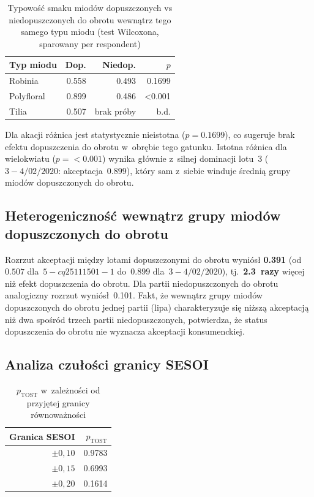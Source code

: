 \begin{table}[h]
\centering
\caption{Typowość smaku miodów dopuszczonych vs niedopuszczonych do obrotu
         wewnątrz tego samego typu miodu
         (test Wilcoxona, sparowany per respondent)}
\label{tab:within}
\begin{tabular}{lrrr}
\toprule
Typ miodu  & Dop.        & Niedop.          & $p$ \\
\midrule
Robinia    & 0.558  & 0.493  & 0.1699 \\
Polyfloral & 0.899 & 0.486 & <0.001 \\
Tilia      & 0.507     & brak próby          & b.d. \\
\bottomrule
\end{tabular}
\end{table}

Dla akacji różnica jest statystycznie nieistotna ($p = 0.1699$), co
sugeruje brak efektu dopuszczenia do obrotu w~obrębie tego gatunku.
Istotna różnica dla wielokwiatu ($p = <0.001$) wynika głównie z~silnej
dominacji lotu~3 ($3-4/02/2020$: akceptacja~$0.899$),
który sam z~siebie winduje średnią grupy miodów dopuszczonych do obrotu.

\subsection{Heterogeniczność wewnątrz grupy miodów dopuszczonych do obrotu}

Rozrzut akceptacji między lotami dopuszczonymi do obrotu wyniósł
\textbf{0.391} (od~$0.507$ dla~$5-cq25111501-1$
do~$0.899$ dla~$3-4/02/2020$), tj.\
\textbf{2.3~razy} więcej niż efekt dopuszczenia do obrotu.
Dla partii niedopuszczonych do obrotu analogiczny rozrzut wyniósł~0.101.
Fakt, że wewnątrz grupy miodów dopuszczonych do obrotu jednej partii (lipa) charakteryzuje się
niższą akceptacją niż dwa spośród trzech partii niedopuszczonych,
potwierdza, że status dopuszczenia do obrotu nie wyznacza akceptacji konsumenckiej.

\subsection{Analiza czułości granicy SESOI}
\label{analiza-czulosci}

\begin{table}[h]
\centering
\caption{$p_{\mathrm{TOST}}$ w~zależności od przyjętej granicy równoważności}
\begin{tabular}{rr}
\toprule
Granica SESOI  & $p_{\mathrm{TOST}}$ \\
\midrule
$\pm 0{,}10$   & 0.9783 \\
$\pm 0{,}15$   & 0.6993 \\
$\pm 0{,}20$   & 0.1614 \\
\bottomrule
\end{tabular}
\end{table}

